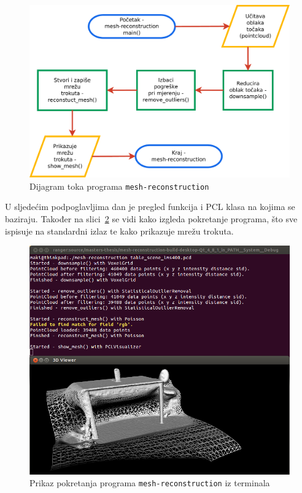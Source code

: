 
\begin{figure}[h]
\renewcommand{\figurename}{Grafikon}
\centering
\includegraphics[scale=0.5]{figures/flowchart.pdf}
\caption{Dijagram toka programa \texttt{mesh-reconstruction} }
\label{fig:flowchart}
\end{figure}

U sljedećim podpoglavljima dan je pregled funkcija i PCL klasa na kojima
se baziraju. Također na slici~\ref{fig:running-mesh-reconstruction} se
vidi kako izgleda pokretanje programa, što sve ispisuje na standardni
izlaz te kako prikazuje mrežu trokuta.

\newpage
\setcounter{figure}{0}
\begin{figure}[h]
\centering
\includegraphics[scale=0.5]{figures/running-mesh-reconstruction.png}
\caption{Prikaz pokretanja programa \texttt{mesh-reconstruction} iz
terminala}
\label{fig:running-mesh-reconstruction}
\end{figure}

